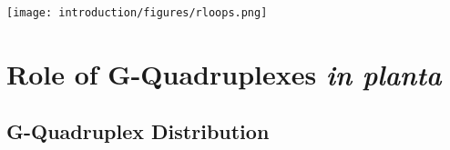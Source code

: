 \documentclass[12pt,a4paper,]{report}
\let\origfigure=\figure
\let\endorigfigure=\endfigure
\renewenvironment{figure}[1][2] {
    \expandafter\origfigure\expandafter[H]
} {
    \endorigfigure
}
\begin{document}
\newpage

\begin{figure}[htbp]
\centering
\texttt{[image: introduction/figures/rloops.png]}
\caption[An R-loop and G4 dependent mechanism for Class Switch Recombination]{\textbf{An   R-loop   and   G4   dependent   mechanism   for   Class   Switch   Recombination}   \textbf{a)}   Schematic   showing   the   formation   of   an   R-loop   from   G-rich   RNA   and   C-rich   template   DNA,   behind   transcribing   RNA   Polymerase   II.   The   G-rich   coding   strand   is   left   in   a   single   stranded   form,   and   may   fold   into   G4s.   \textbf{b)}   Proposed   mechanism   for   Class   Switch   Recombination   of   IgH   gene   through   R-loop   formation.   Transcription   and   splicing   of   the   IgH   locus   results   in   a   G-rich   intron   lariat   which   is   debranched   by   DBR1.   This   folds   into   RNA   G4s   which   recruit   AID.   Resolution   of   G4s   by   DDX1   promotes   R   loop   formation   and   targets   AID   to   the   switch   region,   causing   deamination   and   double   strand   breaks.}
\end{figure}

\newpage

\hypertarget{role-of-g-quadruplexes-in-planta}{%
\section{\texorpdfstring{Role of G-Quadruplexes \emph{in
planta}}{Role of G-Quadruplexes in planta}}\label{role-of-g-quadruplexes-in-planta}}

\label{sec:g4s_in_plants}

\hypertarget{g-quadruplex-distribution}{%
\subsection{G-Quadruplex Distribution}\label{g-quadruplex-distribution}}

\label{ssec:plant_distribution}
\end{document}
